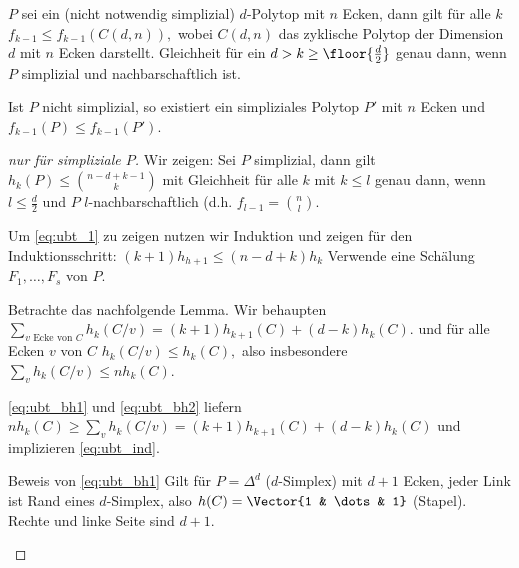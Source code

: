 \begin{thm}
    $P$ sei ein (nicht notwendig simplizial) $d$-Polytop mit $n$ Ecken, dann gilt für alle $k$
    \begin{math}
        f_{k-1} \le f_{k-1}(C(d,n)),
    \end{math}
    wobei $C(d,n)$ das zyklische Polytop der Dimension $d$ mit $n$ Ecken darstellt.
    Gleichheit für ein $d > k \ge \floor{\frac{d}{2}}$ genau dann, wenn $P$ simplizial und nachbarschaftlich ist.

    \begin{note}
        Ist $P$ nicht simplizial, so existiert ein simpliziales Polytop $P'$ mit $n$ Ecken und $f_{k-1}(P) \le f_{k-1}(P')$.
    \end{note}
    \begin{proof}[nur für simpliziale $P$]
        Wir zeigen: Sei $P$ simplizial, dann gilt
        \begin{math}[numbered] \label{eq:ubt_1}
            h_k(P) \le \binom{n-d+k-1}{k}
        \end{math}
        mit Gleichheit für alle $k$ mit $k \le l$ genau dann, wenn $l \le \frac{d}{2}$ und $P$ $l$-nachbarschaftlich (d.h. $f_{l-1} = \binom{n}{l}$.

        Um \eqref{eq:ubt_1} zu zeigen nutzen wir Induktion und zeigen für den Induktionsschritt:
        \begin{math} \label{eq:ubt_ind}
            (k+1) h_{h+1} \le (n-d+k) h_k
        \end{math}
        Verwende eine Schälung $F_1, \dotsc, F_s$ von $P$.

        Betrachte das nachfolgende Lemma.
        Wir behaupten
        \begin{math}[numbered=multiple] \label{eq:ubt_bh1}
            \sum_{\text{$v$ Ecke von $C$}} h_k(C / v) = (k+1) h_{k+1}(C) + (d-k) h_k(C). \tag{B1}
        \end{math}
        und für alle Ecken $v$ von $C$
        \begin{math}[numbered=multiple] \label{eq:ubt_bh2}
            h_k(C/v) \le h_k(C), \tag{B2}
        \end{math}
        also insbesondere $\sum_{v} h_k(C/v) \le n h_k(C)$.

        \eqref{eq:ubt_bh1} und \eqref{eq:ubt_bh2} liefern
        \begin{math}
            n h_k(C)
            \ge \sum_{v} h_k(C/v)
            = (k+1) h_{k+1}(C) + (d-k) h_k(C)
        \end{math}
        und implizieren \eqref{eq:ubt_ind}.
        \begin{seg}{Beweis von \eqref{eq:ubt_bh1}}
            Gilt für $P = \Delta^d$ ($d$-Simplex) mit $d+1$ Ecken, jeder Link ist Rand eines $d$-Simplex, also $h(C) = \Vector{1 & \dots & 1}$ (Stapel).
            Rechte und linke Seite sind $d+1$.


\end{seg}
\end{proof}
\end{thm}

